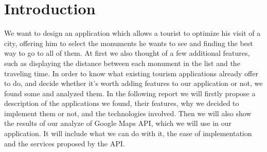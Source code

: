 \section{Introduction}

We want to design an application which allows a tourist to optimize his visit of a city, offering him to select the monuments he wants to see and finding the best way to go to all of them. At first we also thought of a few additional features, such as displaying the distance between each monument in the list and the traveling time. In order to know what existing tourism applications already offer to do, and decide whether it's worth adding features to our application or not, we found some and analyzed them. In the following report we will firstly propose a description of the applications we found, their features, why we decided to implement them or not, and the technologies involved.
Then we will also show the results of our analyze of Google Maps API, which we will use in our application. It will include what we can do with it, the ease of implementation and the services proposed by the API.
